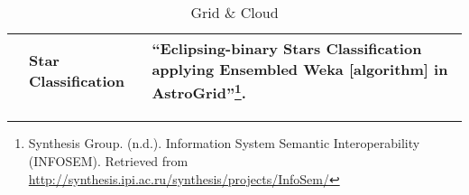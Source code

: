 \begin{table*}[h!t]
\begin{tabular}{|l|p{3cm}|p{12.5cm}|}
			& Star Classification & ``Eclipsing-binary Stars Classification applying Ensembled Weka [algorithm] in AstroGrid''\footnote{Synthesis Group. 
								(n.d.). Information System Semantic Interoperability (INFOSEM). Retrieved from 
								\url{http://synthesis.ipi.ac.ru/synthesis/projects/InfoSem/}}.\\
	\hline
	\end{tabular}
	\caption{Grid \& Cloud}
	\label{table:projects}
\end{table*}
